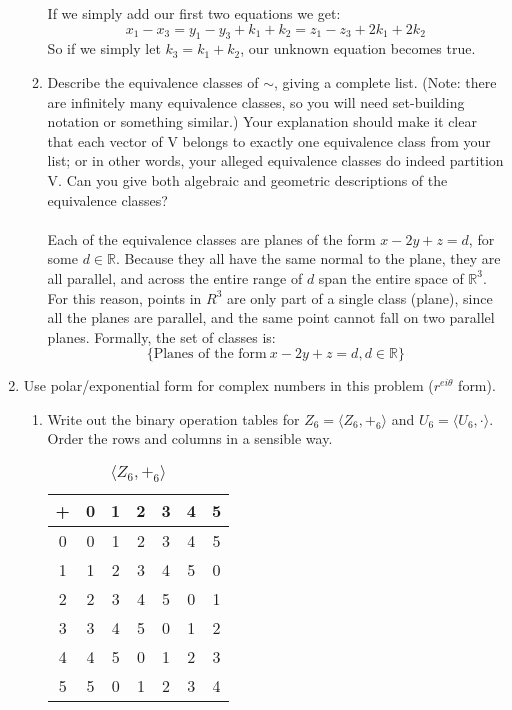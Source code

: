 \begin{enumerate}
\begin{enumerate}
If we simply add our first two equations we get:
$$x_1 - x_3 = y_1 - y_3 + k_1 + k_2 = z_1 - z_3 + 2k_1 + 2k_2$$
So if we simply let $k_3 = k_1 + k_2$, our unknown equation becomes true.

\item Describe the equivalence classes of $\sim$, giving a complete list. (Note: there are infinitely
many equivalence classes, so you will need set-building notation or something similar.)
Your explanation should make it clear that each vector of V belongs to exactly one
equivalence class from your list; or in other words, your alleged equivalence classes do
indeed partition V. Can you give both algebraic and geometric descriptions of the
equivalence classes?\\\\

Each of the equivalence classes are planes of the form $x - 2y + z = d$, for some $d \in \mathds{R}$. Because they all have the same normal to the plane, they are all parallel, and across the entire range of $d$ span the entire space of $\mathds{R}^3$. For this reason, points in $R^3$ are only part of a single class (plane), since all the planes are parallel, and the same point cannot fall on two parallel planes. Formally, the set of classes is:
$$\{\text{Planes of the form}\ x - 2y + z = d, d \in \mathds{R}\}$$
\end{enumerate}

\item
Use polar/exponential form for complex numbers in this problem ($r^{ei\theta}$ form).

\begin{enumerate}
\item Write out the binary operation tables for $Z_6 = \langle Z_6, +_6 \rangle$ and $U_6 = \langle U_6, \cdot \rangle$. Order the
rows and columns in a sensible way.\\

\begin{table}[h!]
  \begin{center}
    \begin{tabular}{|c|c|c|c|c|c|c|}
      \hline
      + & 0 & 1 & 2 & 3 & 4 & 5\\
      \hline  
      0 & 0 & 1 & 2 & 3 & 4 & 5\\
      1 & 1 & 2 & 3 & 4 & 5 & 0\\
      2 & 2 & 3 & 4 & 5 & 0 & 1\\
      3 & 3 & 4 & 5 & 0 & 1 & 2\\
      4 & 4 & 5 & 0 & 1 & 2 & 3\\
      5 & 5 & 0 & 1 & 2 & 3 & 4\\
      \hline
    \end{tabular}
    \caption{$\langle Z_6, +_6 \rangle$}
  \end{center}
\end{table}


\end{enumerate}
\end{enumerate}
